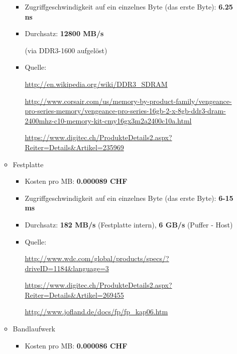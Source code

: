 \documentclass[10pt]{article}
\begin{document}
\begin{enumerate}[label=\alph*)]
\begin{itemize}
\begin{itemize}
						\item Zugriffgeschwindigkeit auf ein einzelnes Byte (das erste Byte): \textbf{6.25 ns}
						
						\item Durchsatz: \textbf{12800 MB/s}
						
						(via DDR3-1600 aufgelöst)
						
						
						\item Quelle:
						
							\url{http://en.wikipedia.org/wiki/DDR3_SDRAM}
							
							\url{http://www.corsair.com/us/memory-by-product-family/vengeance-pro-series-memory/vengeance-pro-series-16gb-2-x-8gb-ddr3-dram-2400mhz-c10-memory-kit-cmy16gx3m2a2400c10a.html}
							
							\url{https://www.digitec.ch/ProdukteDetails2.aspx?Reiter=Details&Artikel=235969}
					\end{itemize}
				\item Festplatte
					\begin{itemize}
						\item Kosten pro MB:\textbf{ 0.000089 CHF}
						
						\item Zugriffgeschwindigkeit auf ein einzelnes Byte (das erste Byte): \textbf{6-15 ms}
						
						\item Durchsatz: \textbf{182 MB/s} (Festplatte intern), \textbf{6 GB/s} (Puffer - Host)
						
						\item Quelle:
						
							\url{http://www.wdc.com/global/products/specs/?driveID=1184&language=3}
							
							\url{https://www.digitec.ch/ProdukteDetails2.aspx?Reiter=Details&Artikel=269455}
							
							\url{http://www.jofland.de/docs/fp/fp_kap06.htm}
					\end{itemize}
					
				\item Bandlaufwerk
					\begin{itemize}
						\item Kosten pro MB: \textbf{0.000086 CHF}
						

\end{itemize}
\end{itemize}
\end{enumerate}
\end{document}
